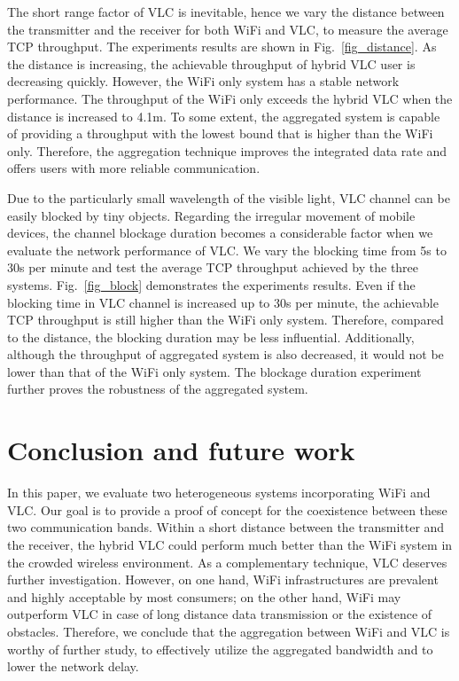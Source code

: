 \documentclass[10pt,journal]{IEEEtran}
\begin{document}
The short range factor of VLC is inevitable, hence we vary the distance between the transmitter and the receiver for both WiFi and VLC, to measure the average TCP throughput. The experiments results are shown in Fig.~\ref{fig_distance}. As the distance is increasing, the achievable throughput of hybrid VLC user is decreasing quickly. However, the WiFi only system has a stable network performance. The throughput of the WiFi only exceeds the hybrid VLC when the distance is increased to 4.1m. To some extent, the aggregated system is capable of providing a throughput with the lowest bound that is higher than the WiFi only. Therefore, the aggregation technique improves the integrated data rate and offers users with more reliable communication.

Due to the particularly small wavelength of the visible light, VLC channel can be easily blocked by tiny objects. Regarding the irregular movement of mobile devices, the channel blockage duration becomes a considerable factor when we evaluate the network performance of VLC. We vary the blocking time from 5s to 30s per minute and test the average TCP throughput achieved by the three systems. Fig.~\ref{fig_block} demonstrates the experiments results. Even if the blocking time in VLC channel is increased up to 30s per minute, the achievable TCP throughput is still higher than the WiFi only system. Therefore, compared to the distance, the blocking duration may be less influential. Additionally, although the throughput of aggregated system is also decreased, it would not be lower than that of the WiFi only system. The blockage duration experiment further proves the robustness of the aggregated system.

\section{Conclusion and future work}\label{sec5}
In this paper, we evaluate two heterogeneous systems incorporating WiFi and VLC. Our goal is to provide a proof of concept for the coexistence between these two communication bands. Within a short distance between the transmitter and the receiver, the hybrid VLC could perform much better than the WiFi system in the crowded wireless environment. As a complementary technique, VLC deserves further investigation. However, on one hand, WiFi infrastructures are prevalent and highly acceptable by most consumers; on the other hand, WiFi may outperform VLC in case of long distance data transmission or the existence of obstacles. Therefore, we conclude that the aggregation between WiFi and VLC is worthy of further study, to effectively utilize the aggregated bandwidth and to lower the network delay.
\end{document}
